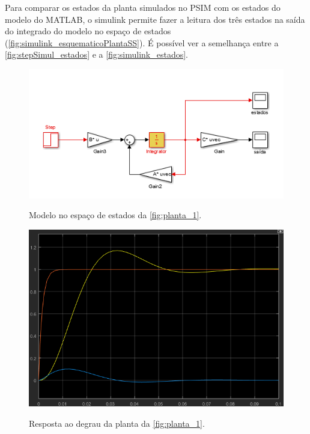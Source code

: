 \documentclass[
	article,			%
	11pt,				%
	oneside,			%
	a4paper,			%
	english,			%
	brazil,				%
	sumario=tradicional
	]{abntex2}
\begin{document}
\pagebreak

Para comparar os estados da planta simulados no PSIM com os estados do modelo do MATLAB, o simulink permite fazer a leitura dos três estados na saída do integrado do modelo no espaço de estados (\autoref{fig:simulink_esquematicoPlantaSS}). É possível ver a semelhança entre a \autoref{fig:stepSimul_estados} e a \autoref{fig:simulink_estados}.

\begin{figure}[htb!]
	\centering
	\caption{Modelo no espaço de estados da \autoref{fig:planta_1}.}
	\includegraphics[scale=0.75]{./img/simulink_esquematicoPlantaSS.PNG}
	\label{fig:simulink_esquematicoPlantaSS}
\end{figure}

\begin{figure}[htb!]
	\centering
	\caption{Resposta ao degrau da planta da \autoref{fig:planta_1}.}
	\includegraphics[scale=0.75]{./img/simulink_estados.PNG}
	\label{fig:simulink_estados}
\end{figure}
\end{document}
